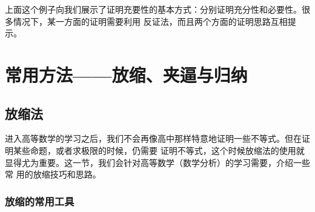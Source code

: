 上面这个例子向我们展示了证明充要性的基本方式：分别证明充分性和必要性。很多情况下，某一方面的证明需要利用
反证法，而且两个方面的证明思路互相提示。

\section{常用方法——放缩、夹逼与归纳}
\subsection{放缩法}
进入高等数学的学习之后，我们不会再像高中那样特意地证明一些不等式。但在证明某些命题，或者求极限的时候，仍需要
证明不等式，这个时候放缩法的使用就显得尤为重要。这一节，我们会针对高等数学（数学分析）的学习需要，介绍一些常
用的放缩技巧和思路。
\subsubsection{放缩的常用工具}


